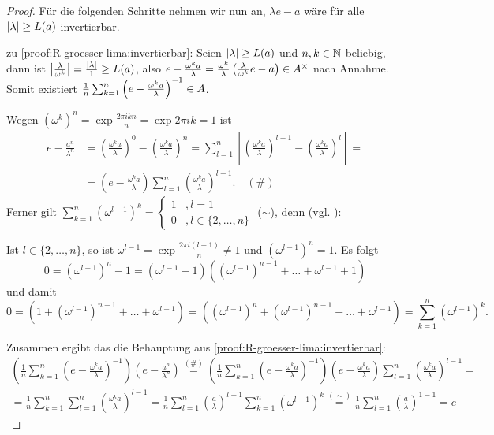 \begin{proof}
Für die folgenden Schritte nehmen wir nun an, $\lambda e - a$ wäre für alle $|\lambda| \geq L(a)$ invertierbar.

zu \ref{proof:R-groesser-lima:invertierbar}:
Seien $|\lambda| \geq L(a)$ und $n,k \in \mathbb{N}$ beliebig, dann ist $\left|\frac{\lambda}{\omega^k}\right| = \frac{|\lambda|}{1} \geq L(a)$, also $e-\frac{\omega^k a}{\lambda} = \frac{\omega^k}{\lambda} \left(\frac{\lambda}{\omega^k}e - a\right) \in A^\times$ nach Annahme. Somit existiert $\frac{1}{n}\sum_{k=1}^n \left(e-\frac{\omega^k a}{\lambda}\right)^{-1} \in A$.

Wegen $\left(\omega^{k}\right)^n = \exp{\frac{2\pi i kn}{n}} = \exp{2\pi i k} = 1$ ist
\begin{align*}
	e - \frac{a^n}{\lambda^n} &= \left(\frac{\omega^k a}{\lambda}\right)^0 - \left(\frac{\omega^k a}{\lambda}\right)^n = \sum_{l=1}^n \left[\left(\frac{\omega^k a}{\lambda}\right)^{l-1} - \left(\frac{\omega^k a}{\lambda}\right)^l\right] = \\
		&=\left(e - \frac{\omega^k a}{\lambda}\right)\sum_{l=1}^n \left(\frac{\omega^k a}{\lambda}\right)^{l-1}. \quad (\#)
\end{align*}
Ferner gilt $\sum_{k=1}^n \left(\omega^{l-1}\right)^k = \begin{cases}1 &,l=1 \\ 0 &,l\in\{2, \dots, n\}\end{cases}$ ($\sim$), denn (vgl. \cite[S. 10-8,10-9]{Einheitswurzeln}):

Ist $l\in\{2, \dots, n\}$, so ist $\omega^{l-1} = \exp{\frac{2\pi i(l-1)}{n}} \neq 1$ und $\left(\omega^{l-1}\right)^n = 1$. Es folgt
	\[0 = \left(\omega^{l-1}\right)^n - 1 = \left(\omega^{l-1} - 1\right)\left(\left(\omega^{l-1}\right)^{n-1} + \dots + \omega^{l-1} + 1\right)\]
und damit
	\[0 = \left(1 + \left(\omega^{l-1}\right)^{n-1} + \dots + \omega^{l-1}\right) = \left(\left(\omega^{l-1}\right)^{n} + \left(\omega^{l-1}\right)^{n-1} + \dots + \omega^{l-1}\right) = \sum_{k=1}^n \left(\omega^{l-1}\right)^k.\]

Zusammen ergibt das die Behauptung aus \ref{proof:R-groesser-lima:invertierbar}:
\begin{align*}
	\left(\frac{1}{n}\sum_{k=1}^n \left(e-\frac{\omega^k a}{\lambda}\right)^{-1}\right) \left(e - \frac{a^n}{\lambda^n}\right) \overset{(\#)}{=} \left(\frac{1}{n}\sum_{k=1}^n \left(e-\frac{\omega^k a}{\lambda}\right)^{-1}\right) \left(e - \frac{\omega^k a}{\lambda}\right)\sum_{l=1}^n \left(\frac{\omega^k a}{\lambda}\right)^{l-1} = \\
	= \frac{1}{n}\sum_{k=1}^n \sum_{l=1}^n \left(\frac{\omega^k a}{\lambda}\right)^{l-1} = \frac{1}{n} \sum_{l=1}^n \left(\frac{a}{\lambda}\right)^{l-1} \sum_{k=1}^n \left(\omega^{l-1}\right)^k \overset{(\sim)}{=} \frac{1}{n} \sum_{l=1}^n \left(\frac{a}{\lambda}\right)^{1-1} = e
\end{align*}


\end{proof}

